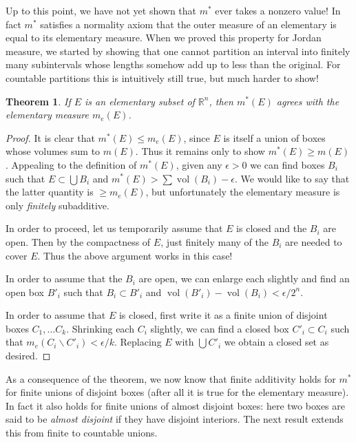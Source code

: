 \documentclass[11pt,oneside]{amsbook}
\renewcommand{\setminus}{\smallsetminus}
\newcommand{\RR}{\mathbb R}
\DeclareMathOperator{\vol}{vol}
\theoremstyle{definition}
\theoremstyle{plain}
\newtheorem{thm}{Theorem}[section]
\theoremstyle{definition}
\theoremstyle{remark}
\numberwithin{equation}{section}
\numberwithin{figure}{section}
\begin{document}
Up to this point, we have not yet shown that $m^*$ ever takes a nonzero value! In fact $m^*$ satisfies a normality axiom that the outer measure of an elementary is equal to its elementary measure. When we proved this property for Jordan measure, we started by showing that one cannot partition an interval into finitely many subintervals whose lengths somehow add up to less than the original. For countable partitions this is intuitively still true, but much harder to show!

\begin{thm}
  If $E$ is an elementary subset of $\RR^n$, then $m^*(E)$ agrees with the elementary measure $m_e(E)$.
\end{thm}

\begin{proof}
  It is clear that $m^*(E)\leq m_e(E)$, since $E$ is itself a union of boxes whose volumes sum to $m(E)$. Thus it remains only to show $m^*(E)\geq m(E)$. Appealing to the definition of $m^*(E)$, given any $\epsilon>0$ we can find boxes $B_i$ such that $E\subset\bigcup B_i$ and $m^*(E)>\sum\vol(B_i)-\epsilon$. We would like to say that the latter quantity is $\geq m_e(E)$, but unfortunately the elementary measure is only \emph{finitely} subadditive.

  In order to proceed, let us temporarily assume that $E$ is closed and the $B_i$ are open. Then by the compactness of $E$, just finitely many of the $B_i$ are needed to cover $E$. Thus the above argument works in this case!

  In order to assume that the $B_i$ are open, we can enlarge each slightly and find an open box $B'_i$ such that $B_i\subset B'_i$ and $\vol(B'_i)-\vol(B_i)<\epsilon/2^n$.

  In order to assume that $E$ is closed, first write it as a finite union of disjoint boxes $C_1,\ldots C_k$. Shrinking each $C_i$ slightly, we can find a closed box $C'_i\subset C_i$ such that $m_e(C_i\setminus C'_i)<\epsilon/k$. Replacing $E$ with $\bigcup C'_i$ we obtain a closed set as desired.
\end{proof}

As a consequence of the theorem, we now know that finite additivity holds for $m^*$ for finite unions of disjoint boxes (after all it is true for the elementary measure). In fact it also holds for finite unions of almost disjoint boxes: here two boxes are said to be \emph{almost disjoint} if they have disjoint interiors. The next result extends this from finite to countable unions.
\end{document}
